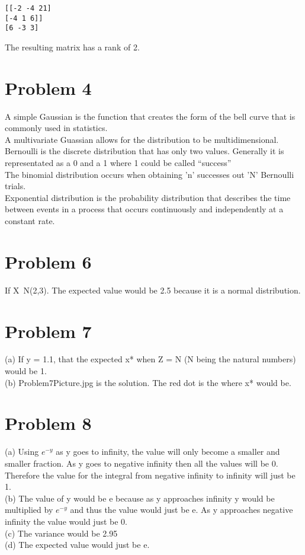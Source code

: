 \documentclass[a4paper]{article}
\begin{document}
\begin{lstlisting}
[[-2 -4 21]
[-4 1 6]]
[6 -3 3]
\end{lstlisting}

The resulting matrix has a rank of 2.

\section{Problem 4}
A simple Gaussian is the function that creates the form of the bell curve that is commonly used in statistics. \\
A multivariate Guassian allows for the distribution to be multidimensional. \\
Bernoulli is the discrete distribution that has only two values. Generally it is representated as a 0 and a 1 where 1 could be called "`success"' \\
The binomial distribution occurs when obtaining 'n' successes out 'N' Bernoulli trials. \\
Exponential distribution is the probability distribution that describes the time between events in a process that occurs continuously and independently at a constant rate. \\

\section{Problem 6}
If X~N(2,3). The expected value would be 2.5 because it is a normal distribution. \\

\section{Problem 7}
(a) If y = 1.1, that the expected x* when Z = N (N being the natural numbers) would be 1. \\
(b) Problem7Picture.jpg is the solution. The red dot is the where x* would be.

\section{Problem 8}
(a) Using $e^{-y}$ as y goes to infinity, the value will only become a smaller and smaller fraction. As y goes to negative infinity then all the values will be 0. Therefore the value for the integral from negative infinity to infinity will just be 1. \\
(b) The value of y would be e because as y approaches infinity y would be multiplied by $e^{-y}$ and thus the value would just be e. As y approaches negative infinity the value would just be 0. \\
(c) The variance would be 2.95 \\
(d) The expected value would just be e. \\
\end{document}

